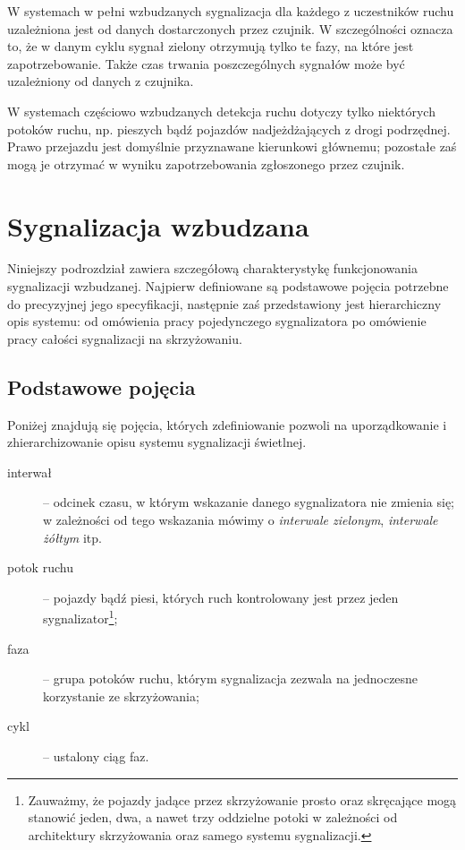 \documentclass{pracamgr}
\theoremstyle{plain}
\begin{document}
W systemach w pełni wzbudzanych sygnalizacja dla każdego z uczestników
ruchu uzależniona jest od danych dostarczonych przez czujnik. W
szczególności oznacza to, że w danym cyklu sygnał zielony otrzymują
tylko te fazy, na które jest zapotrzebowanie. Także czas trwania
poszczególnych sygnałów może być uzależniony od danych z czujnika.

W systemach częściowo wzbudzanych detekcja ruchu dotyczy tylko
niektórych potoków ruchu, np. pieszych bądź pojazdów nadjeżdżających z
drogi podrzędnej. Prawo przejazdu jest domyślnie przyznawane
kierunkowi głównemu; pozostałe zaś mogą je otrzymać w wyniku
zapotrzebowania zgłoszonego przez czujnik.

\section{Sygnalizacja wzbudzana}
\label{s:sygn-szczegoly}

Niniejszy podrozdział zawiera szczegółową charakterystykę
funkcjonowania sygnalizacji wzbudzanej. Najpierw definiowane są
podstawowe pojęcia potrzebne do precyzyjnej jego specyfikacji,
następnie zaś przedstawiony jest hierarchiczny opis systemu: od
omówienia pracy pojedynczego sygnalizatora po omówienie pracy całości
sygnalizacji na skrzyżowaniu.

\subsection{Podstawowe pojęcia}
\label{ss:pojecia}

Poniżej znajdują się pojęcia, których zdefiniowanie pozwoli na
uporządkowanie i zhierarchizowanie opisu systemu sygnalizacji
świetlnej.
\begin{description}
  \item[interwał] -- odcinek czasu, w którym wskazanie danego
  sygnalizatora nie zmienia się; w zależności od tego wskazania mówimy o
  \emph{interwale zielonym}, \emph{interwale żółtym} itp.
  \item[potok ruchu] -- pojazdy bądź piesi, których ruch kontrolowany
  jest przez jeden sygnalizator\footnote{Zauważmy, że pojazdy jadące
    przez skrzyżowanie prosto oraz skręcające mogą stanowić jeden,
    dwa, a nawet trzy oddzielne potoki w zależności od architektury
    skrzyżowania oraz samego systemu sygnalizacji.};
  \item[faza] -- grupa potoków ruchu, którym sygnalizacja zezwala na
  jednoczesne korzystanie ze skrzyżowania;
  \item[cykl] -- ustalony ciąg faz.
\end{description}
\end{document}
